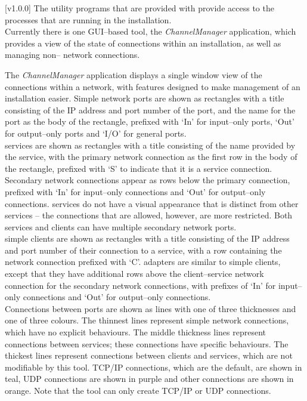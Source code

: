 [v1.0.0]
The utility programs that are provided with \mplusm{} provide access to the processes that
are running in the \mplusm{} installation.\\

Currently there is one GUI--based tool, the \emph{ChannelManager} application,
which provides a view of the state of connections within an \mplusm{} installation, as
well as managing non--\mplusm{} \yarp{} network connections.

The \emph{ChannelManager} application displays a single window view of the connections
within a \yarp{} network, with features designed to make management of an \mplusm{}
installation easier.
Simple \yarp{} network ports are shown as rectangles with a title consisting of the IP
address and port number of the port, and the \yarp{} name for the port as the body of the
rectangle, prefixed with `In' for input--only ports, `Out' for output--only ports and
`I/O' for general ports.\\

\mplusm{} services are shown as rectangles with a title consisting of the name provided by
the service, with the primary \yarp{} network connection as the first row in the body of
the rectangle, prefixed with `S' to indicate that it is a service connection.
Secondary \yarp{} network connections appear as rows below the primary connection,
prefixed with `In' for input--only connections and `Out' for output--only connections.
\mplusm{}  services do not have a visual appearance that is distinct from
other \mplusm{} services -- the connections that are allowed, however, are more
restricted.
Both \mplusm{} services and clients can have multiple secondary \yarp{} network ports.\\

\mplusm{} simple clients are shown as rectangles with a title consisting of the IP address
and port number of their connection to a service, with a row containing the \yarp{}
network connection prefixed with `C'.
\mplusm{} adapters are similar to \mplusm{} simple clients, except that they have
additional rows above the client--service \yarp{} network connection for the secondary
\yarp{} network connections, with prefixes of `In' for input--only connections and `Out'
for output--only connections.\\

Connections between ports are shown as lines with one of three thicknesses and one of
three colours.
The thinnest lines represent simple \yarp{} network connections, which have no explicit
behaviours.
The middle thickness lines represent connections between  services; these
connections have specific behaviours.
The thickest lines represent connections between clients and services, which are not
modifiable by this tool.
TCP/IP connections, which are the default, are shown in teal, UDP connections are shown in
purple and other connections are shown in orange.
Note that the tool can only create TCP/IP or UDP connections.\\

